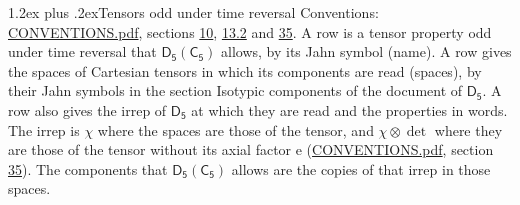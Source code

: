 \documentclass[10pt,a4paper]{article}
\makeatletter
\renewcommand\section{\@startsection{section}{1}{\z@}{-3ex plus -1ex minus -.2ex}%
  {1.2ex plus .2ex}{\normalfont\large\sffamily\bfseries\color{parttitle}}}
\numberwithin{equation}{section}
\newcommand{\grp}[1]{\mathsf{#1}}
\newcommand{\irrprod}{\otimes}
\makeatother
\begin{document}
\section{Tensors odd under time reversal}\label{s:time_odd}
Conventions: \href{../../CONVENTIONS.pdf}{CONVENTIONS.pdf}, sections \href{../../../rotation/CONVENTIONS.pdf\#conv.10}{10}, \href{../../../rotation/CONVENTIONS.pdf\#conv.13.2}{13.2} and \href{../../CONVENTIONS.pdf\#conv.35}{35}.
\leavevmode\label{n:head.name.property}A row is a tensor property odd under time reversal that $\grp{D_{5}}(\grp{C_{5}})$ allows, by its Jahn symbol (name). \label{n:head.spaces}A row gives the spaces of Cartesian tensors in which its components are read (spaces), by their Jahn symbols in the section Isotypic components of the document of \href{../../../rotation/data/pdf/D5.pdf}{$\grp{D_{5}}$}. \label{n:head.properties}A row also gives the irrep of $\grp{D_{5}}$ at which they are read and the properties in words. The irrep is $\chi$ where the spaces are those of the tensor, and $\chi \irrprod \det$ where they are those of the tensor without its axial factor e (\href{../../CONVENTIONS.pdf}{CONVENTIONS.pdf}, section \href{../../CONVENTIONS.pdf\#conv.35}{35}). The components that $\grp{D_{5}}(\grp{C_{5}})$ allows are the copies of that irrep in those spaces.
\end{document}
